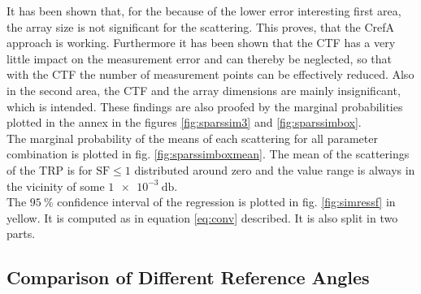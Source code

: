 It has been shown that, for the because of the lower error interesting first area, the array size is not significant for the scattering. This proves, that the \ac{CrefA} approach is working. 
Furthermore it has been shown that the \ac{CTF} has a very little impact on the measurement error and can thereby be neglected, so that with the \ac{CTF} the number of measurement points can be effectively reduced. 
Also in the second area, the \ac{CTF} and the array dimensions are mainly insignificant, which is intended. These findings are also proofed by the marginal probabilities plotted in the annex in the figures \ref{fig:sparssim3} and \ref{fig:sparssimbox}.\\
The marginal probability of the means of each scattering for all parameter combination is plotted in fig. \ref{fig:sparssimboxmean}. The mean of the scatterings of the \ac{TRP} is for $\text{SF} \le 1$ distributed around zero and the value range is always in the vicinity of some $\SI{1e-3}{\decibel}$.\\
The $\SI{95}{\percent}$ confidence interval of the regression is plotted in fig. \ref{fig:simressf} in yellow. It is computed as in equation \ref{eq:conv} described. It is also split in two parts.

\subsection{Comparison of Different Reference Angles}

